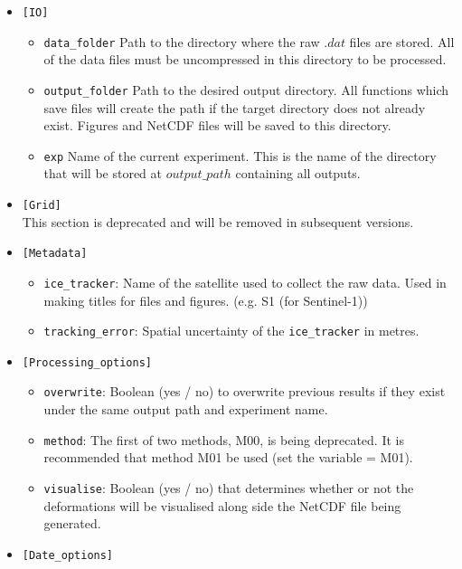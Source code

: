 \documentclass{article}
\begin{document}
        \begin{itemize}
            \item{} \verb?[IO]?
            \begin{itemize}
                \item \verb?data_folder? Path to the directory where the raw $.dat$ files are stored. All of the data files must be uncompressed in this directory to be processed.
                \item \verb?output_folder? Path to the desired output directory. All functions which save files will create the path if the target directory does not already exist. Figures and NetCDF files will be saved to this directory.
                \item \verb?exp? Name of the current experiment. This is the name of the directory that will be stored at $output\_path$ containing all outputs.
            \end{itemize}
            \item{} \verb?[Grid]? \\
                This section is deprecated and will be removed in subsequent versions.
            \item{} \verb?[Metadata]?
            \begin{itemize}
                \item \verb?ice_tracker?: Name of the satellite used to collect the raw data. Used in making titles for files and figures. (e.g. S1 (for Sentinel-1))
                \item \verb?tracking_error?: Spatial uncertainty of the \verb?ice_tracker? in metres.
            \end{itemize}
            \item{} \verb?[Processing_options]?
            \begin{itemize}
                \item \verb?overwrite?: Boolean (yes / no) to overwrite previous results if they exist under the same output path and experiment name.
                \item \verb?method?: The first of two methods, M00, is being deprecated. It is recommended that method M01 be used (set the variable = M01).
                \item \verb?visualise?: Boolean (yes / no) that determines whether or not the deformations will be visualised along side the NetCDF file being generated.
            \end{itemize}
            \item{} \verb?[Date_options]?

\end{itemize}
\end{document}
